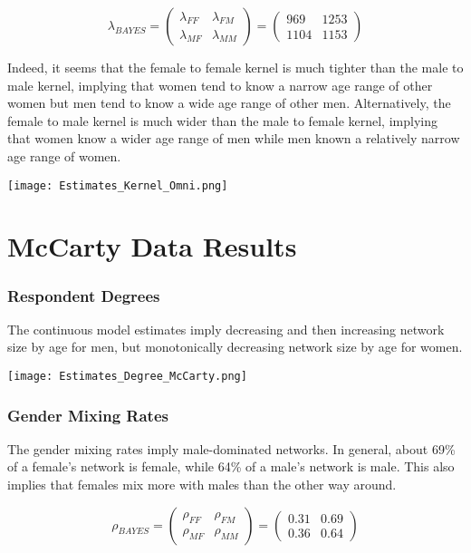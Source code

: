 \documentclass[12pt]{article}
\begin{document}
$$ \lambda_{BAYES}
= \left( \begin{array}{cc} \lambda_{FF} & \lambda_{FM} \\
\lambda_{MF} & \lambda_{MM} \end{array} \right) 
= \left( \begin{array}{cc}
969 & 1253 \\
1104 & 1153 \end{array} \right) $$ \vspace{7 pt}

\noindent Indeed, it seems that the female to female kernel is much tighter than the male to male kernel, implying that women tend to know a narrow age range of other women but men tend to know a wide age range of other men. Alternatively, the female to male kernel is much wider than the male to female kernel, implying that women know a wider age range of men while men known a relatively narrow age range of women.

\begin{center}
\texttt{[image: Estimates\_Kernel\_Omni.png]}
\end{center}

\pagebreak
\section{McCarty Data Results}
\subsubsection*{Respondent Degrees}
The continuous model estimates imply decreasing and then increasing network size by age for men, but monotonically decreasing network size by age for women.

\begin{center}
\texttt{[image: Estimates\_Degree\_McCarty.png]}
\end{center}

\subsubsection*{Gender Mixing Rates}
\noindent The gender mixing rates imply male-dominated networks. In general, about 69\% of a female's network is female, while 64\% of a male's network is male. This also implies that females mix more with males than the other way around.

$$ \rho_{BAYES}
= \left( \begin{array}{cc} \rho_{FF} & \rho_{FM} \\
\rho_{MF} & \rho_{MM} \end{array} \right) 
= \left( \begin{array}{cc}
0.31 & 0.69 \\
0.36 & 0.64 \end{array} \right) $$
\end{document}
